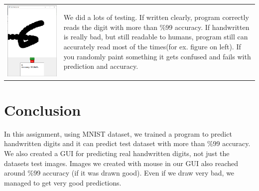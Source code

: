 \documentclass[onecolumn]{article}
\begin{document}
 \begin{tabular}{C{3.8cm}  L{8.8cm}}
        \includegraphics[width=0.9\linewidth]{test1.PNG} &  \newline 
        We did a lots of testing. If written clearly, program correctly reads the digit with more than \%99 accuracy. If handwritten is really bad, but still readable to humans, program still can accurately read most of the times(for ex. figure on left). If you randomly paint something it gets confused and fails with prediction and accuracy.
       
       
    \end{tabular}

\clearpage

\section{Conclusion}

In this assignment, using MNIST dataset, we trained a program to predict handwritten digits and it can predict test dataset with more than \%99 accuracy. We also created a GUI for predicting real handwritten digits, not just the datasets test images. Images we created with mouse in our GUI also reached around \%99 accuracy (if it was drawn good). Even if we draw very bad, we managed to get very good predictions.
\end{document}
